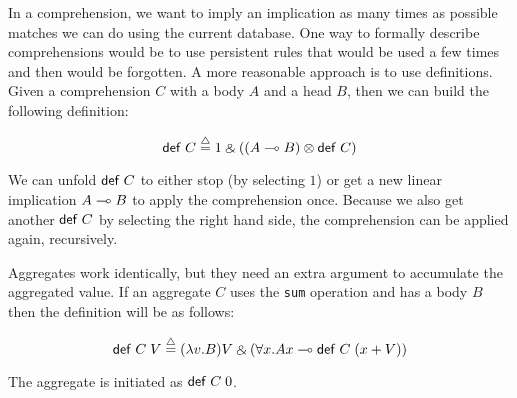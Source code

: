 In a comprehension, we want to imply an implication as many times as possible matches we can do
using the current database. One way to formally describe comprehensions would be to use persistent
rules that would be used a few times and then would be forgotten. A more reasonable approach is to use
definitions. Given a comprehension $C$ with a body $A$ and a head $B$, then we can build the following definition:

\[
\compr{C} \defeq 1 \with ((A \lolli B) \otimes \compr{C})
\]

We can unfold $\mathsf{def} \; C$ to either stop (by selecting $1$) or get a new linear implication $A \multimap B$
to apply the comprehension once. Because we also get another $\mathsf{def} \; C$ by selecting the right hand side,
the comprehension can be applied again, recursively.

Aggregates work identically, but they need an extra argument to accumulate the aggregated value.
If an aggregate $C$ uses the \texttt{sum} operation and has a body $B$ then the definition will be
as follows:

\[
\compr{C} \; V \defeq (\lambda v. B)V \with (\forall x. Ax \lolli \compr{C} \; (x + V))
\]

The aggregate is initiated as $\mathsf{def} \; C \; 0$.

